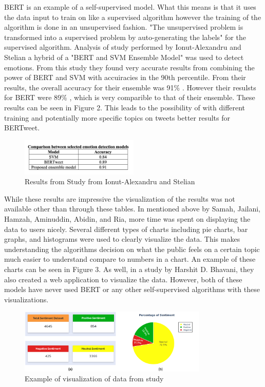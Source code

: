 \documentclass[conference]{IEEEtran}
\begin{document}
BERT is an example of a self-supervised model. 
What this means is that it uses the data input to train on like a supervised algorithm however the training of the algorithm is done in an unsupervised fashion.
"The unsupervised problem is transformed into a supervised problem by auto-generating the labels\cite{b9}" for the supervised algorithm.
Analysis of study performed by Ionut-Alexandru and Stelian a hybrid of a "BERT and SVM Ensemble Model\cite{b8}" was used to detect emotions.
From this study they found very accurate results from combining the power of BERT and SVM with accuiracies in the 90th percentile.
From their results, the overall accuracy for their ensemble was 91\% \cite{b8}.
However their resulsts for BERT were 89\% \cite{b8}, which is very comparible to that of their ensemble.
These results can be seen in Figure 2.
This leads to the possibility of with different training and potentially more specific topics on tweets better results for BERTweet.

\begin{figure}[b]
    \centerline{\includegraphics[width=0.5\textwidth]{BERTweetChartFromStudy.png}}
    \caption{Results from Study from Ionut-Alexandru and Stelian\cite{b8}}
\end{figure}

While these results are impressive the visualization of the results was not available other than through these tables.
In mentioned above by Samah, Jailani, Hamzah, Aminuddin, Abidin, and Ria, more time was spent on displaying the data to users nicely.
Several different types of charts including pie charts, bar graphs, and histograms were used to clearly visualize the data.
This makes understanding the algorithms decision on what the public feels on a certain topic much easier to understand compare to numbers in a chart.
An example of these charts can be seen in Figure 3. 
As well, in a study by Harshit D. Bhavani, they also created a web application to visualize the data\cite{b3}. 
However, both of these models have never used BERT or any other self-supervised algorithms with these visualizations.

\begin{figure}[t]
    \centering
    \includegraphics[width=0.8\textwidth]{BetterVisualizationsOfData.png}
    \caption{Example of visualization of data from study\cite{b2}}
\end{figure}
\end{document}
